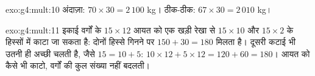 \begin{solution}{exo:g4:mult:10}
अंदाज़ा: $70 \times 30 = 2\,100$ kg। ठीक-ठीक:
$67 \times 30 = 2\,010$ kg।
\end{solution}

\begin{solution}{exo:g4:mult:11}
इकाई वर्गों के $15 \times 12$ आयत को एक खड़ी रेखा से
$15 \times 10$ और $15 \times 2$ के हिस्सों में काटा जा सकता है:
दोनों हिस्से गिनने पर $150 + 30 = 180$ मिलता है। दूसरी कटाई भी
उतनी ही अच्छी चलती है, जैसे $15 = 10 + 5$:
$10 \times 12 + 5 \times 12 = 120 + 60 = 180$। आयत को कैसे भी
काटो, वर्गों की कुल संख्या नहीं बदलती।
\end{solution}
